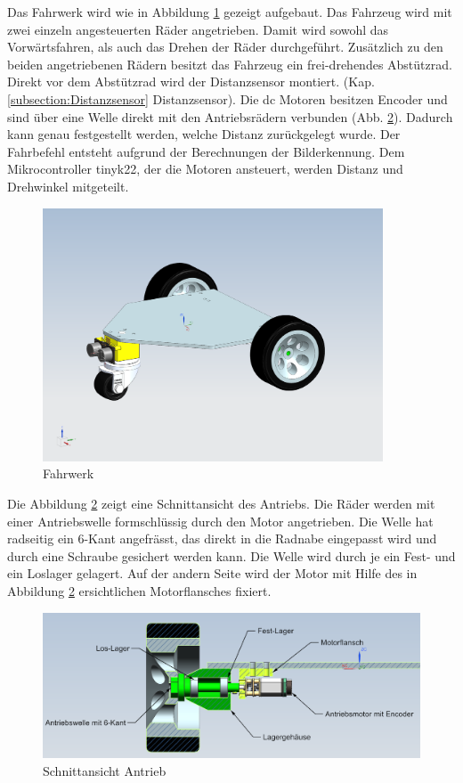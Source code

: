 Das Fahrwerk wird wie in Abbildung  \ref{fig:Prototype_Fahrwerk_CAD} gezeigt aufgebaut. Das Fahrzeug wird mit zwei einzeln angesteuerten Räder angetrieben. Damit wird sowohl das Vorwärtsfahren, als auch das Drehen der Räder durchgeführt. Zusätzlich zu den beiden angetriebenen Rädern besitzt das Fahrzeug ein frei-drehendes Abstützrad. Direkt vor dem Abstützrad wird der Distanzsensor montiert. (Kap. \ref{subsection:Distanzsensor} Distanzsensor). Die \acrfull{dc} Motoren besitzen Encoder und sind über eine Welle direkt mit den Antriebsrädern verbunden (Abb. \ref{fig:sectionview-wheelmount}). Dadurch kann genau festgestellt werden, welche Distanz zurückgelegt wurde. Der Fahrbefehl entsteht aufgrund der Berechnungen der Bilderkennung. Dem Mikrocontroller \gls{tinyk22}, der die Motoren ansteuert, werden Distanz und Drehwinkel mitgeteilt. 

\begin{figure}[H]
\centering
\includegraphics[width=0.9\textwidth]{assets/prototyp-fahrwerk/Prototyp_Fahrwerk_CAD.png}
\caption{Fahrwerk}
\label{fig:Prototype_Fahrwerk_CAD}
\end{figure}

Die Abbildung \ref{fig:sectionview-wheelmount} zeigt eine Schnittansicht des Antriebs. Die Räder werden mit einer Antriebswelle formschlüssig durch den Motor angetrieben. Die Welle hat radseitig ein 6-Kant angefrässt, das direkt in die Radnabe eingepasst wird und durch eine Schraube gesichert werden kann. Die Welle wird durch je ein Fest- und ein Loslager gelagert. Auf der andern Seite wird der Motor mit Hilfe des in Abbildung \ref{fig:sectionview-wheelmount} ersichtlichen Motorflansches fixiert. 

\begin{figure}[H]
\centering
\includegraphics[width=1.0\textwidth]{img/Antrieb.png}
\caption{Schnittansicht Antrieb}
\label{fig:sectionview-wheelmount}
\end{figure}


